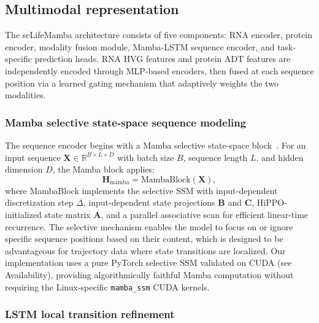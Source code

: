 \documentclass[11pt,twocolumn]{article}
\begin{document}
\subsection{Multimodal representation}

The scLifeMamba architecture consists of five components: RNA encoder, protein encoder, modality fusion module, Mamba-LSTM sequence encoder, and task-specific prediction heads. RNA HVG features and protein ADT features are independently encoded through MLP-based encoders, then fused at each sequence position via a learned gating mechanism that adaptively weights the two modalities.

\subsubsection{Mamba selective state-space sequence modeling}

The sequence encoder begins with a Mamba selective state-space block~\citep{gu2023}. For an input sequence $\mathbf{X} \in \mathbb{R}^{B \times L \times D}$ with batch size $B$, sequence length $L$, and hidden dimension $D$, the Mamba block applies:
\begin{equation}
\mathbf{H}_{\text{mamba}} = \text{MambaBlock}(\mathbf{X}),
\end{equation}
where MambaBlock implements the selective SSM with input-dependent discretization step $\Delta$, input-dependent state projections $\mathbf{B}$ and $\mathbf{C}$, HiPPO-initialized state matrix $\mathbf{A}$, and a parallel associative scan for efficient linear-time recurrence. The selective mechanism enables the model to focus on or ignore specific sequence positions based on their content, which is designed to be advantageous for trajectory data where state transitions are localized. Our implementation uses a pure PyTorch selective SSM validated on CUDA (see Availability), providing algorithmically faithful Mamba computation without requiring the Linux-specific \texttt{mamba\_ssm} CUDA kernels.

\subsubsection{LSTM local transition refinement}
\end{document}
